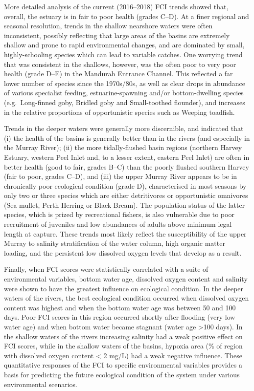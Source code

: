 \documentclass[
]{book}
\begin{document}
More detailed analysis of the current (2016--2018) FCI trends showed that, overall, the estuary is in fair to poor health (grades C--D). At a finer regional and seasonal resolution, trends in the shallow nearshore waters were often inconsistent, possibly reflecting that large areas of the basins are extremely shallow and prone to rapid environmental changes, and are dominated by small, highly-schooling species which can lead to variable catches. One worrying trend that was consistent in the shallows, however, was the often poor to very poor health (grade D--E) in the Mandurah Entrance Channel. This reflected a far lower number of species since the 1970s/80s, as well as clear drops in abundance of various specialist feeding, estuarine-spawning and/or bottom-dwelling species (e.g.~Long-finned goby, Bridled goby and Small-toothed flounder), and increases in the relative proportions of opportunistic species such as Weeping toadfish.

Trends in the deeper waters were generally more discernible, and indicated that (i) the health of the basins is generally better than in the rivers (and especially in the Murray River); (ii) the more tidally-flushed basin regions (northern Harvey Estuary, western Peel Inlet and, to a lesser extent, eastern Peel Inlet) are often in better health (good to fair, grades B--C) than the poorly flushed southern Harvey (fair to poor, grades C--D), and (iii) the upper Murray River appears to be in chronically poor ecological condition (grade D), characterised in most seasons by only two or three species which are either detritivores or opportunistic omnivores (Sea mullet, Perth Herring or Black Bream). The population status of the latter species, which is prized by recreational fishers, is also vulnerable due to poor recruitment of juveniles and low abundances of adults above minimum legal length at capture. These trends most likely reflect the susceptibility of the upper Murray to salinity stratification of the water column, high organic matter loading, and the persistent low dissolved oxygen levels that develop as a result.

Finally, when FCI scores were statistically correlated with a suite of environmental variables, bottom water age, dissolved oxygen content and salinity were shown to have the greatest influence on ecological condition. In the deeper waters of the rivers, the best ecological condition occurred when dissolved oxygen content was highest and when the bottom water age was between 50 and 100 days. Poor FCI scores in this region occurred shortly after flooding (very low water age) and when bottom water became stagnant (water age \textgreater100 days). In the shallow waters of the rivers increasing salinity had a weak positive effect on FCI scores, while in the shallow waters of the basins, hypoxia area (\% of region with dissolved oxygen content \textless{} 2 mg/L) had a weak negative influence. These quantitative responses of the FCI to specific environmental variables provides a basis for predicting the future ecological condition of the system under various environmental scenarios.~
\end{document}
